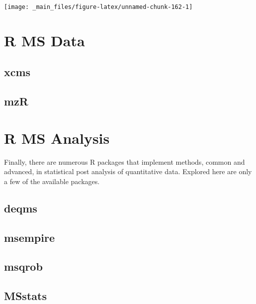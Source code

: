 \documentclass[
]{book}
\begin{document}
\begin{center}\texttt{[image: \_main\_files/figure-latex/unnamed-chunk-162-1]} \end{center}

\hypertarget{r-ms-data}{%
\section{R MS Data}\label{r-ms-data}}

\hypertarget{xcms}{%
\subsection*{xcms}\label{xcms}}

\hypertarget{mzr}{%
\subsection*{mzR}\label{mzr}}

\hypertarget{r-ms-analysis}{%
\section{R MS Analysis}\label{r-ms-analysis}}

Finally, there are numerous R packages that implement methods, common and advanced, in statistical post analysis of quantitative data. Explored here are only a few of the available packages.

\hypertarget{deqms}{%
\subsection*{deqms}\label{deqms}}

\hypertarget{msempire}{%
\subsection*{msempire}\label{msempire}}

\hypertarget{msqrob}{%
\subsection*{msqrob}\label{msqrob}}

\hypertarget{msstats}{%
\subsection*{MSstats}\label{msstats}}
\end{document}
